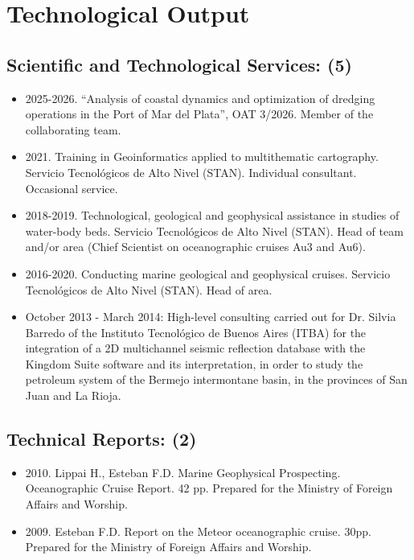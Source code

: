 \documentclass[11pt, a4paper]{article}
\begin{document}
\section{Technological Output}

\subsection{Scientific and Technological Services: (5)}

\begin{itemize}
  \item 2025-2026. “Analysis of coastal dynamics and optimization of dredging operations in the Port of Mar del Plata”, OAT 3/2026. Member of the collaborating team.
  \item 2021. Training in Geoinformatics applied to multithematic cartography. Servicio Tecnológicos de Alto Nivel (STAN). Individual consultant. Occasional service.
  \item 2018-2019. Technological, geological and geophysical assistance in studies of water-body beds. Servicio Tecnológicos de Alto Nivel (STAN). Head of team and/or area (Chief Scientist on oceanographic cruises Au3 and Au6).
  \item 2016-2020. Conducting marine geological and geophysical cruises. Servicio Tecnológicos de Alto Nivel (STAN). Head of area.
  \item October 2013 - March 2014: High-level consulting carried out for Dr. Silvia Barredo of the Instituto Tecnológico de Buenos Aires (ITBA) for the integration of a 2D multichannel seismic reflection database with the Kingdom Suite software and its interpretation, in order to study the petroleum system of the Bermejo intermontane basin, in the provinces of San Juan and La Rioja.
\end{itemize}

\subsection{Technical Reports: (2)}

\begin{itemize}
  \item 2010. Lippai H., Esteban F.D. Marine Geophysical Prospecting. Oceanographic Cruise Report. 42 pp. Prepared for the Ministry of Foreign Affairs and Worship.
  \item 2009. Esteban F.D. Report on the Meteor oceanographic cruise. 30pp. Prepared for the Ministry of Foreign Affairs and Worship.
\end{itemize}
\end{document}
